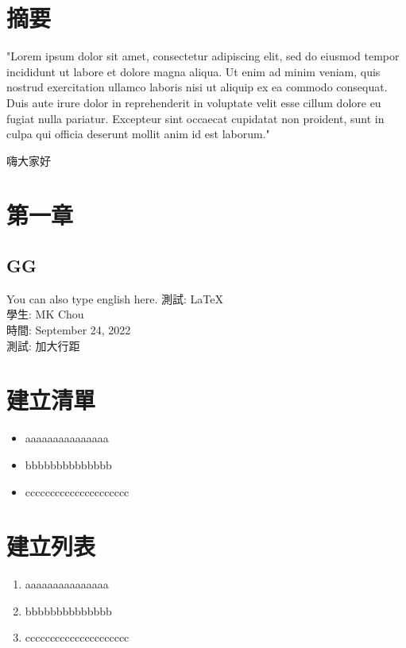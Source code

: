 \documentclass[12pt]{article}
\begin{document}
\begin{CJK*}{UTF8}{bsmi}

\pagebreak
\section *{摘要}
"Lorem ipsum dolor sit amet, consectetur adipiscing elit, sed do eiusmod tempor incididunt ut labore et dolore magna aliqua. Ut enim ad minim veniam, quis nostrud exercitation ullamco laboris nisi ut aliquip ex ea commodo consequat. Duis aute irure dolor in reprehenderit in voluptate velit esse cillum dolore eu fugiat nulla pariatur. Excepteur sint occaecat cupidatat non proident, sunt in culpa qui officia deserunt mollit anim id est laborum."


\pagebreak %
\tableofcontents %

\pagebreak

嗨大家好
\setcounter {page}{43}
\pagebreak %

\section{第一章}
	\subsection{GG}
		You can also type english here.
		\vfill
		測試: LaTeX\\
		學生: MK Chou \\
		時間: September 24, 2022\\[1cm] %
		測試: 加大行距

\section{建立清單}
	\begin{itemize}
		\item aaaaaaaaaaaaaaa
		\item bbbbbbbbbbbbbb
                  \item ccccccccccccccccccccc
	\end{itemize}

\section{建立列表}
	\begin{enumerate}
		\item aaaaaaaaaaaaaaa
		\item bbbbbbbbbbbbbb
                  \item ccccccccccccccccccccc
	\end{enumerate}


\end{CJK*}
\end{document}
